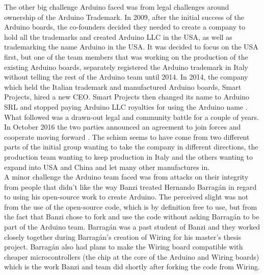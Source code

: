 The other big challenge Arduino faced was from legal challenges around ownership of the Arduino Trademark. In 2009, after the initial success of the Arduino boards, the co-founders decided they needed to create a company to hold all the trademarks and created Arduino LLC in the USA, as well as trademarking the name Arduino in the USA. It was decided to focus on the USA first, but one of the team members that was working on the production of the existing Arduino boards, separately registered the Arduino trademark in Italy without telling the rest of the Arduino team until 2014. In 2014, the company which held the Italian trademark and manufactured Arduino boards, Smart Projects, hired a new CEO. Smart Projects then changed its name to Arduino SRL and stopped paying Arduino LLC royalties for using the Arduino name 
\cite{RN115}. What followed was a drawn-out legal and community battle for a couple of years. In October 2016 the two parties announced an agreement to join forces and cooperate moving forward
\cite{RN116}. The schism seems to have come from two different parts of the initial group wanting to take the company in different directions, the production team wanting to keep production in Italy and the others wanting to expand into USA and China and let many other manufactures in. \\

A minor challenge the Arduino team faced was from attacks on their integrity from people that didn't like the way Banzi treated Hernando Barragán in regard to using his open-source work to create Arduino. The perceived slight was not from the use of the open-source code, which is by definition free to use, but from the fact that Banzi chose to fork and use the code without asking Barragán to be part of the Arduino team. Barragán was a past student of Banzi and they worked closely together during Barragán's creation of Wiring for his master's thesis project. Barragán also had plans to make the Wiring board compatible with cheaper microcontrollers (the chip at the core of the Arduino and Wiring boards) which is the work Banzi and team did shortly after forking the code from Wiring.\\

